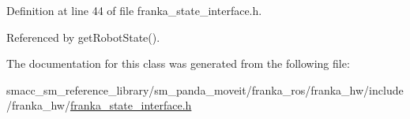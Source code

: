 Definition at line 44 of file franka\+\_\+state\+\_\+interface.\+h.



Referenced by get\+Robot\+State().



The documentation for this class was generated from the following file\+:\begin{DoxyCompactItemize}
\item 
smacc\+\_\+sm\+\_\+reference\+\_\+library/sm\+\_\+panda\+\_\+moveit/franka\+\_\+ros/franka\+\_\+hw/include/franka\+\_\+hw/\hyperlink{franka__state__interface_8h}{franka\+\_\+state\+\_\+interface.\+h}\end{DoxyCompactItemize}
